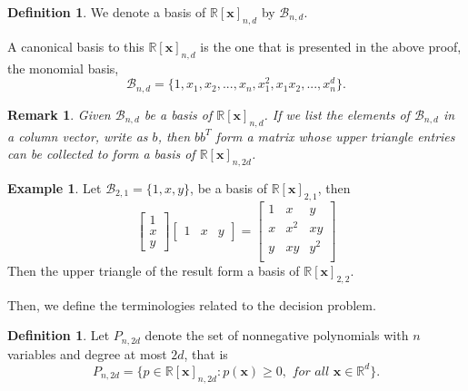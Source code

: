 \documentclass[12pt]{amsart}
\numberwithin{equation}{section}
\newtheorem{remark}[thm]{Remark}
\theoremstyle{definition}
\newtheorem{definition}[thm]{Definition}
\newtheorem{example}[thm]{Example}
\numberwithin{thm}{section}
\begin{document}
\begin{definition}
     We denote a basis of $\mathbb{R}[\mathbf{x}]_{n, d}$ by $\mathcal{B}_{n, d}$.
\end{definition}

A canonical basis to this $\mathbb{R}[\mathbf{x}]_{n, d}$ is the one that is presented in the above proof, the monomial basis,
\begin{equation*}
     \mathcal{B}_{n, d} = \{1, x_1, x_2, ..., x_n, x_1 ^ 2, x_1 x_2, ..., x_n^d\}.
\end{equation*}

\begin{remark}
     \label{rem:upgrade}
     Given $\mathcal{B}_{n, d}$ be a basis of $\mathbb{R}[\mathbf{x}]_{n, d}$. 
     If we list the elements of $\mathcal{B}_{n, d}$ in a column vector, write as $b$, 
     then $b b^T$ form a matrix whose upper triangle entries can be collected to form a basis of $\mathbb{R}[\mathbf{x}]_{n, 2d}$.
\end{remark}

\begin{example}
     Let $\mathcal{B}_{2, 1} = \{1, x, y\}$, be a basis of $\mathbb{R}[\mathbf{x}]_{2, 1}$, then 
     \begin{equation*}
          \begin{bmatrix}
               1 \\
               x \\
               y
          \end{bmatrix}
          \begin{bmatrix}
               1 & x & y
          \end{bmatrix}
          = \begin{bmatrix}
               1 & x & y \\
               x & x^2 & xy \\
               y & xy & y^2 \\
          \end{bmatrix}
     \end{equation*}
     Then the upper triangle of the result form a basis of $\mathbb{R}[\mathbf{x}]_{2, 2}$.
\end{example}

\smallskip

Then, we define the terminologies related to the decision problem.

\begin{definition}
     \label{def:NGP}
     Let $P_{n, 2d}$ denote the set of nonnegative polynomials with 
     $n$ variables and degree at most $2d$, that is 
     \begin{equation*}
          P_{n, 2d} = \{ p \in \mathbb{R}[\mathbf{x}]_{n, 2d}: p(\mathbf{x}) \geq 0, \textit{ for all } \mathbf{x} \in \mathbb{R}^d \}.
     \end{equation*}
\end{definition}
\end{document}
